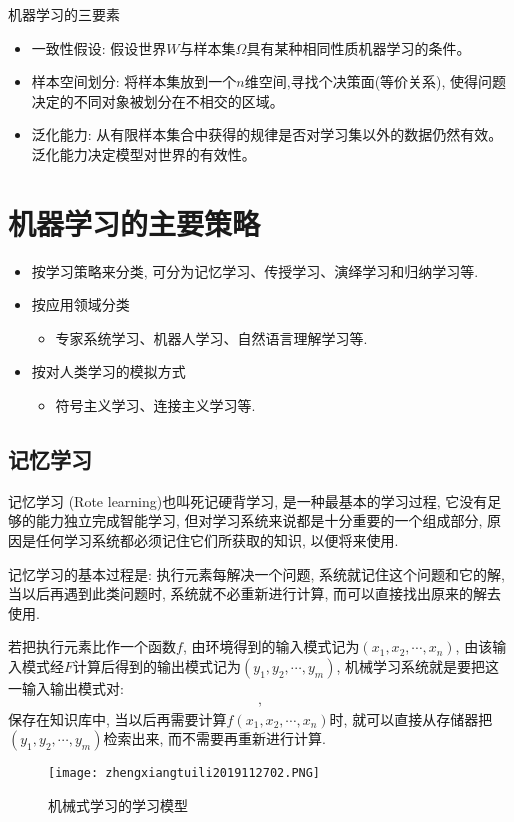 机器学习的三要素
\begin{itemize}
\item 一致性假设: 假设世界$W$与样本集$\Omega$具有某种相同性质机器学习的条件。
\item 样本空间划分: 将样本集放到一个$n$维空间,寻找个决策面(等价关系), 使得问题决定的不同对象被划分在不相交的区域。
\item 泛化能力: 从有限样本集合中获得的规律是否对学习集以外的数据仍然有效。泛化能力决定模型对世界的有效性。
\end{itemize}
\section{机器学习的主要策略}
\begin{itemize}
\item 按学习策略来分类, 可分为记忆学习、传授学习、演绎学习和归纳学习等.

\item 按应用领域分类
    \begin{itemize}
      \item 专家系统学习、机器人学习、自然语言理解学习等.
    \end{itemize}
\item 按对人类学习的模拟方式
    \begin{itemize}
      \item 符号主义学习、连接主义学习等.
    \end{itemize}
\end{itemize}
\subsection{记忆学习}

记忆学习 (Rote learning)也叫死记硬背学习, 是一种最基本的学习过程, 它没有足够的能力独立完成智能学习, 但对学习系统来说都是十分重要的一个组成部分, 原因是任何学习系统都必须记住它们所获取的知识, 以便将来使用.

记忆学习的基本过程是: 执行元素每解决一个问题, 系统就记住这个问题和它的解, 当以后再遇到此类问题时, 系统就不必重新进行计算, 而可以直接找出原来的解去使用.

若把执行元素比作一个函数$f$, 由环境得到的输入模式记为$ (x_1,x_2,\cdots ,x_n)$, 由该输入模式经$F$计算后得到的输出模式记为$ (y_1,y_2,\cdots ,y_m)$, 机械学习系统就是要把这一输入输出模式对: 
\begin{align}
    [ (x_1,x_2,\cdots ,x_n) , (y_1,y_2,\cdots ,y_m)],
\end{align}
保存在知识库中, 当以后再需要计算$f (x_1,x_2,\cdots ,x_n)$时, 就可以直接从存储器把$ (y_1,y_2,\cdots ,y_m)$检索出来, 而不需要再重新进行计算.
\begin{figure}[H]
    \centering
    \texttt{[image: zhengxiangtuili2019112702.PNG]}
    \caption{机械式学习的学习模型}
    \label{AI32fig2702}
\end{figure}
